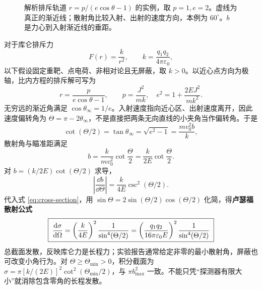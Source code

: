 \begin{figure}[htbp]
\centering
{}
\caption{解析排斥轨道 $r=p/(e\cos\theta-1)$ 的实例，取 $p=1,e=2$。虚线为真正的渐近线；散射角比较入射、出射的速度方向，本例为 $60^\circ$。$b$ 是力心到入射渐近线的垂距。}
\label{fig:scattering}
\end{figure}

对于库仑排斥力
\begin{equation}
F(r)=\frac{k}{r^2},\qquad k=\frac{q_1q_2}{4\pi\varepsilon_0},
\end{equation}
以下假设固定重靶、点电荷、非相对论且无屏蔽，取 $k>0$。以近心点方向为极轴，比内方程的排斥解可写为
\[
r=\frac{p}{e\cos\theta-1},\qquad
p=\frac{J^2}{mk},\quad
e^2=1+\frac{2EJ^2}{mk^2}.
\]
无穷远的渐近角满足 $\cos\theta_\infty=1/e$。入射速度指向近心区、出射速度离开，因此速度偏转角为 $\Theta=\pi-2\theta_\infty$，不是直接把两条无向直线的小夹角当作偏转角。于是
\[
\cot(\Theta/2)=\tan\theta_\infty=\sqrt{e^2-1}
=\frac{mv_0^2b}{k},
\]
散射角与瞄准距满足
\begin{equation}
b=\frac{k}{mv_0^2}\cot\frac{\Theta}{2}
=\frac{k}{2E}\cot\frac{\Theta}{2}.
\label{eq:rutherford-b}
\end{equation}
对 $b=(k/2E)\cot(\Theta/2)$ 求导，
\[
\left|\frac{\dd b}{\dd\Theta}\right|=\frac{k}{4E}\csc^2(\Theta/2).
\]
代入式 \eqref{eq:cross-section}，用 $\sin\Theta=2\sin(\Theta/2)\cos(\Theta/2)$ 化简，得\textbf{卢瑟福散射公式}
\begin{equation}
\boxed{\;
\frac{\mathrm{d} \sigma}{\mathrm{d} \Omega}
=\left(\frac{k}{4E}\right)^2
\frac{1}{\sin^4(\Theta/2)}
=\left(\frac{q_1q_2}{16\pi\varepsilon_0E}\right)^2
\frac{1}{\sin^4(\Theta/2)}
\;}
\label{eq:rutherford}
\end{equation}
总截面发散，反映库仑力是长程力；实验报告通常给定非零的最小散射角，屏蔽也可改变小角行为。对 $\Theta\ge\Theta_{\min}>0$，积分截面为 $\sigma=\pi[k/(2E)]^2\cot^2(\Theta_{\min}/2)$，与 $\pi b_{\max}^2$ 一致。不能只凭“探测器有限大小”就消除包含零角的长程发散。

